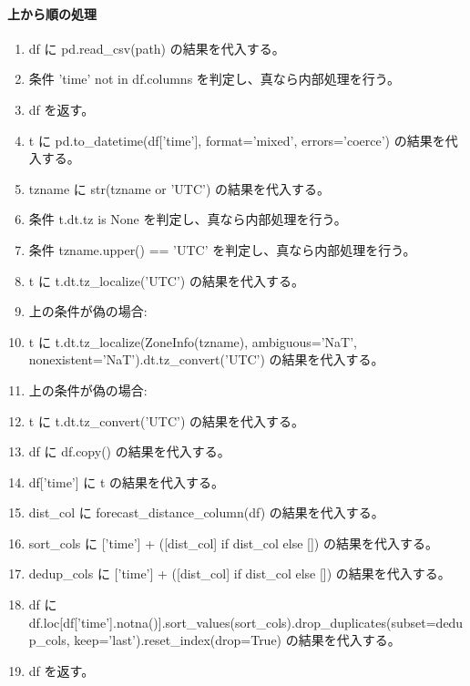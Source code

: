 \documentclass[a4paper,11pt]{article}
\begin{document}
            \paragraph{上から順の処理}
            \begin{enumerate}[leftmargin=1.8em]
            \item df に pd.read\_csv(path) の結果を代入する。
\item 条件 'time' not in df.columns を判定し、真なら内部処理を行う。
\item   df を返す。
\item t に pd.to\_datetime(df['time'], format='mixed', errors='coerce') の結果を代入する。
\item tzname に str(tzname or 'UTC') の結果を代入する。
\item 条件 t.dt.tz is None を判定し、真なら内部処理を行う。
\item   条件 tzname.upper() == 'UTC' を判定し、真なら内部処理を行う。
\item     t に t.dt.tz\_localize('UTC') の結果を代入する。
\item     上の条件が偽の場合:
\item     t に t.dt.tz\_localize(ZoneInfo(tzname), ambiguous='NaT', nonexistent='NaT').dt.tz\_convert('UTC') の結果を代入する。
\item   上の条件が偽の場合:
\item   t に t.dt.tz\_convert('UTC') の結果を代入する。
\item df に df.copy() の結果を代入する。
\item df['time'] に t の結果を代入する。
\item dist\_col に forecast\_distance\_column(df) の結果を代入する。
\item sort\_cols に ['time'] + ([dist\_col] if dist\_col else []) の結果を代入する。
\item dedup\_cols に ['time'] + ([dist\_col] if dist\_col else []) の結果を代入する。
\item df に df.loc[df['time'].notna()].sort\_values(sort\_cols).drop\_duplicates(subset=dedup\_cols, keep='last').reset\_index(drop=True) の結果を代入する。
\item df を返す。
            \end{enumerate}
\end{document}
